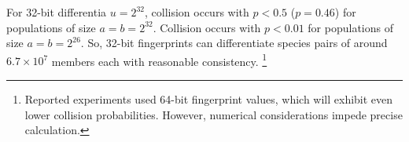 For 32-bit differentia $u = 2^{32}$, collision occurs with $p < 0.5$ ($p = 0.46$) for populations of size $a = b = 2^{32}$.
Collision occurs with $p < 0.01$ for populations of size $a = b = 2^{26}$.
So, 32-bit fingerprints can differentiate species pairs of around $6.7 \times 10^{7}$ members each with reasonable consistency.%
\footnote{
Reported experiments used 64-bit fingerprint values, which will exhibit even lower collision probabilities.
However, numerical considerations impede precise calculation.
}
